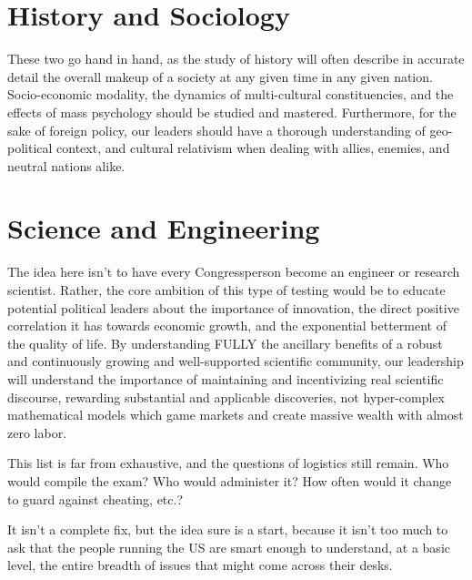 \documentclass[11pt]{article}
\begin{document}
\section{History and Sociology}

These two go hand in hand, as the study of history will often describe in accurate detail the overall makeup of a
society at any given time in any given nation. Socio-economic modality, the dynamics of multi-cultural constituencies,
and the effects of mass psychology should be studied and mastered. Furthermore, for the sake of foreign policy, our
leaders should have a thorough understanding of geo-political context, and cultural relativism when dealing with allies,
enemies, and neutral nations alike.

\section{Science and Engineering}

The idea here isn’t to have every Congressperson become an engineer or research scientist. Rather, the core ambition of
this type of testing would be to educate potential political leaders about the importance of innovation, the direct
positive correlation it has towards economic growth, and the exponential betterment of the quality of life. By
understanding FULLY the ancillary benefits of a robust and continuously growing and well-supported scientific community,
our leadership will understand the importance of maintaining and incentivizing real scientific discourse, rewarding
substantial and applicable discoveries, not hyper-complex mathematical models which game markets and create massive
wealth with almost zero labor.

This list is far from exhaustive, and the questions of logistics still remain. Who would compile the exam? Who would
administer it? How often would it change to guard against cheating, etc.?

It isn’t a complete fix, but the idea sure is a start, because it isn’t too much to ask that the people running the US
are smart enough to understand, at a basic level, the entire breadth of issues that might come across their desks.
\end{document}

